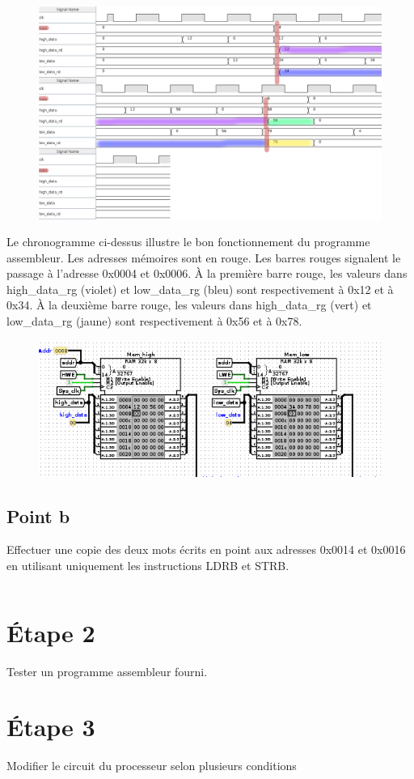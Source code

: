 \documentclass[a4paper]{article} %
\begin{document}
\begin{figure}[H]
    \centering
    \includegraphics[width=1\textwidth]{src/CHRONO_ET1.png}
 \label{chrono_et1}
\end{figure}
Le chronogramme ci-dessus illustre le bon fonctionnement du programme assembleur. Les adresses mémoires sont en rouge. Les barres rouges signalent le passage à l'adresse 0x0004 et 0x0006. À la première barre rouge, les valeurs dans high\_data\_rg (violet) et low\_data\_rg (bleu) sont respectivement à 0x12 et à 0x34. À la deuxième barre rouge, les valeurs dans high\_data\_rg (vert) et low\_data\_rg (jaune)  sont respectivement à 0x56 et à 0x78.
\begin{figure}[H]
    \centering
    \includegraphics[width=.8\textwidth]{src/MEM_EXMPL.png}
    \label{fig:mem_exmpl_pic}
\end{figure}

\subsection{Point b}
Effectuer une copie des deux mots écrits en point aux adresses 0x0014 et 0x0016 en utilisant uniquement les instructions LDRB et STRB.

\begin{lstlisting}

\end{lstlisting}
\section{Étape 2}
Tester un programme assembleur fourni.
\section{Étape 3}
Modifier le circuit du processeur selon plusieurs conditions
\end{document}
